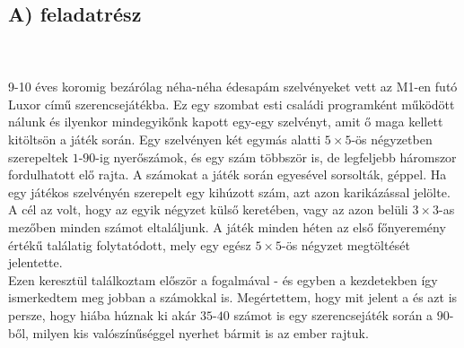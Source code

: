 \section{}
\subsection*{A) feladatrész}
\\ \\
9-10 éves koromig bezárólag néha-néha édesapám szelvényeket vett az M1-en futó Luxor című szerencsejátékba. Ez egy szombat esti családi programként működött nálunk és ilyenkor mindegyikőnk kapott egy-egy szelvényt, amit ő maga kellett kitöltsön a játék során. Egy szelvényen két egymás alatti $5 \times 5$-ös négyzetben szerepeltek $1$-$90$-ig nyerőszámok, és egy szám többször is, de legfeljebb háromszor fordulhatott elő rajta. A számokat a játék során egyesével sorsolták, géppel. Ha egy játékos szelvényén szerepelt egy kihúzott szám, azt azon karikázással jelölte. A cél az volt, hogy az egyik négyzet külső keretében, vagy az azon belüli $3 \times 3$-as mezőben minden számot eltaláljunk. A játék minden héten az első főnyeremény értékű találatig folytatódott, mely egy egész $5 \times 5$-ös négyzet megtöltését jelentette. \\
Ezen keresztül találkoztam először a  fogalmával - és egyben a kezdetekben így ismerkedtem meg jobban a számokkal is. Megértettem, hogy mit jelent a  és azt is persze, hogy hiába húznak ki akár $35$-$40$ számot is egy szerencsejáték során a $90$-ből, milyen kis valószínűséggel nyerhet bármit is az ember rajtuk.

